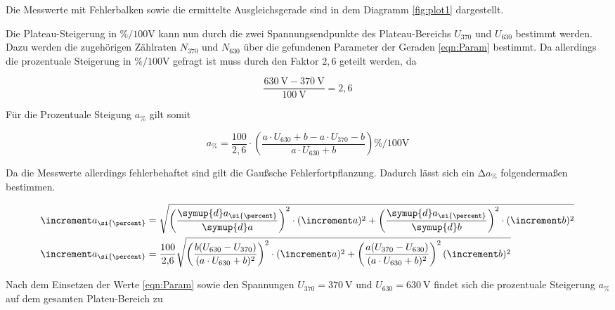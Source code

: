\begin{flushleft}
Die Messwerte mit Fehlerbalken sowie die ermittelte Ausgleichsgerade sind in dem Diagramm
\ref{fig:plot1} dargestellt.

Die Plateau-Steigerung in $\si{\percent\per{100}\volt}$ kann nun durch die zwei Spannungsendpunkte des Plateau-Bereichs $U_{370}$ und $U_{630}$
bestimmt werden. Dazu werden die zugehörigen Zählraten $N_{370}$ und $N_{630}$ über die gefundenen Parameter der
Geraden \eqref{eqn:Param} bestimmt. Da allerdings die prozentuale Steigerung in $\si{\percent\per{100}\volt}$ gefragt ist muss durch den Faktor $2{,}6$ geteilt
werden, da

\begin{equation}
\frac{\SI{630}{\volt} - \SI{370}{\volt}}{\SI{100}{\volt}} = 2{,}6
\end{equation}

Für die Prozentuale Steigung $a_{\si{\percent}}$ gilt somit

\begin{equation}
a_{\si{\percent}} = \frac{100}{2{,}6} \cdot\left( \frac{a \cdot U_{630} + b - a \cdot U_{370} - b}{a \cdot U_{630} + b} \right) \si{\percent\per{100}\volt}
\end{equation}

Da die Messwerte allerdings fehlerbehaftet sind gilt die Gaußsche Fehlerfortpflanzung. Dadurch lässt sich
ein $\increment a_{\si{\percent}}$ folgendermaßen bestimmen.

\begin{align}
\increment a_{\si{\percent}} &= \sqrt{\left(\frac{\symup{d}a_{\si{\percent}}}{\symup{d}a}\right)^{2} \cdot 
(\increment a)^{2} + \left(\frac{\symup{d}a_{\si{\percent}}}{\symup{d}b}\right)^{2} \cdot
(\increment b)^{2}} \\
\increment a_{\si{\percent}} &= \frac{100}{2{,}6}\sqrt{\left(\frac{b(U_{630}-U_{370})}{(a \cdot U_{630} + b)^{2}}\right)^{2} \cdot 
(\increment a)^{2} + 
\left(\frac{a(U_{370}-U_{630})}{(a \cdot U_{630} + b)^{2}}\right)^{2}
(\increment b)^{2}}
\end{align}

Nach dem Einsetzen der Werte \eqref{eqn:Param} sowie den Spannungen $U_{370} = \SI{370}{\volt}$ und $U_{630} = \SI{630}{\volt}$ 
findet sich die prozentuale Steigerung $a_{\si{\percent}}$ auf dem gesamten Plateu-Bereich zu



\end{flushleft}
